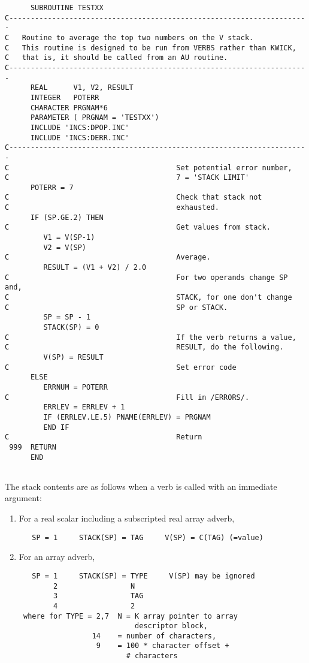 \begin{verbatim}
      SUBROUTINE TESTXX
C----------------------------------------------------------------------
C   Routine to average the top two numbers on the V stack.
C   This routine is designed to be run from VERBS rather than KWICK,
C   that is, it should be called from an AU routine.
C----------------------------------------------------------------------
      REAL      V1, V2, RESULT
      INTEGER   POTERR
      CHARACTER PRGNAM*6
      PARAMETER ( PRGNAM = 'TESTXX')
      INCLUDE 'INCS:DPOP.INC'
      INCLUDE 'INCS:DERR.INC'
C----------------------------------------------------------------------
C                                       Set potential error number,
C                                       7 = 'STACK LIMIT'
      POTERR = 7
C                                       Check that stack not
C                                       exhausted.
      IF (SP.GE.2) THEN
C                                       Get values from stack.
         V1 = V(SP-1)
         V2 = V(SP)
C                                       Average.
         RESULT = (V1 + V2) / 2.0
C                                       For two operands change SP and,
C                                       STACK, for one don't change
C                                       SP or STACK.
         SP = SP - 1
         STACK(SP) = 0
C                                       If the verb returns a value,
C                                       RESULT, do the following.
         V(SP) = RESULT
C                                       Set error code
      ELSE
         ERRNUM = POTERR
C                                       Fill in /ERRORS/.
         ERRLEV = ERRLEV + 1
         IF (ERRLEV.LE.5) PNAME(ERRLEV) = PRGNAM
         END IF
C                                       Return
 999  RETURN
      END


\end{verbatim}
The stack contents are as follows when a verb is called with an
immediate argument:
\begin{enumerate} %
\item For a real scalar including a subscripted real array adverb,

\begin{verbatim}
   SP = 1     STACK(SP) = TAG     V(SP) = C(TAG) (=value)

\end{verbatim}
\item For an array adverb,

\begin{verbatim}
   SP = 1     STACK(SP) = TYPE     V(SP) may be ignored
        2                 N
        3                 TAG
        4                 2
 where for TYPE = 2,7  N = K array pointer to array
                           descriptor block,
                 14    = number of characters,
                  9    = 100 * character offset +
                         # characters

\end{verbatim}

\end{enumerate} %
